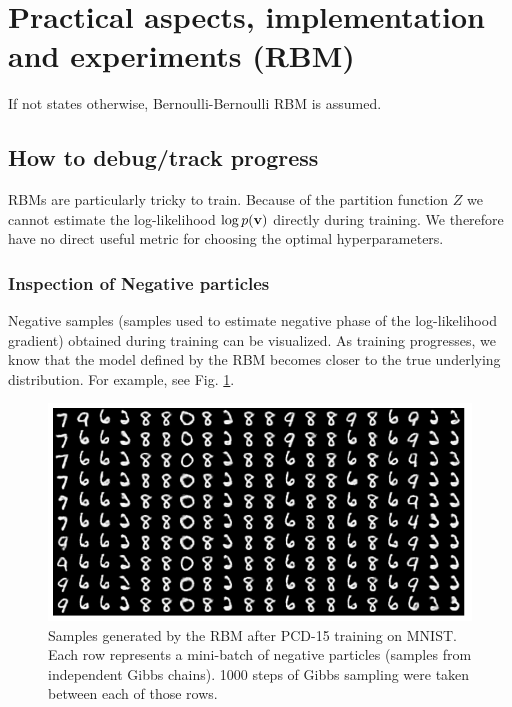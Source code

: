 \newpage
\section{Practical aspects, implementation and experiments (RBM) \cite{coursera_nn, tutorial2014lisa, hinton2010practical, yosinski2012visually, goodfellow2016deep}}
If not states otherwise, Bernoulli-Bernoulli RBM is assumed.
\subsection{How to debug/track progress}
RBMs are particularly tricky to train. Because of the partition function $Z$ we cannot estimate the log-likelihood $\log p(\mathbf{v})$ directly during training. We therefore have no direct useful metric for choosing the optimal hyperparameters.

\subsubsection{Inspection of Negative particles}
Negative samples (samples used to estimate negative phase of the log-likelihood gradient) obtained during training can be visualized. As training progresses, we know that the model defined by the RBM becomes closer to the true underlying distribution. For example, see Fig. \ref{fig:rbm_samples}.
\begin{figure}[h]
\begin{mdframed}
\includegraphics[scale=0.4]{img/rbm_samples.png}
\centering
\caption{Samples generated by the RBM after PCD-15 training on MNIST. Each row represents a mini-batch of negative particles (samples from independent Gibbs chains). 1000 steps of Gibbs sampling were taken between each of those rows.}
\label{fig:rbm_samples}
\end{mdframed}
\end{figure}

